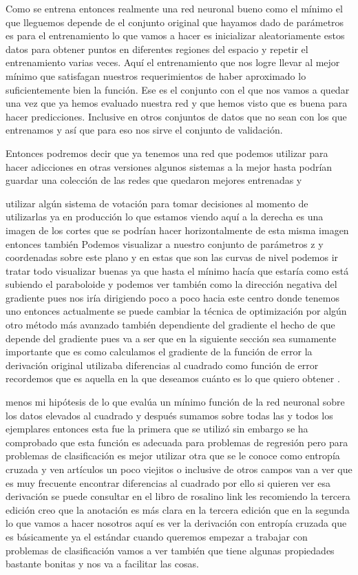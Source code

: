Como se entrena entonces realmente una red neuronal bueno como el mínimo el que lleguemos depende de el conjunto original que hayamos dado de parámetros es para el entrenamiento lo que vamos a hacer es inicializar aleatoriamente estos datos para obtener puntos en diferentes regiones del espacio y repetir el entrenamiento varias veces. Aquí el entrenamiento que nos logre llevar al mejor mínimo que satisfagan nuestros requerimientos de haber aproximado lo suficientemente bien la función. Ese es el conjunto con el que nos vamos a quedar una vez que ya hemos evaluado nuestra red y que hemos visto que es buena para hacer predicciones. Inclusive en otros conjuntos de datos que no sean con los que entrenamos y así que para eso nos sirve el conjunto de validación. 

Entonces podremos decir que ya tenemos una red que podemos utilizar para hacer adicciones en otras versiones algunos sistemas a la mejor hasta podrían guardar una colección de las redes que quedaron mejores entrenadas y 
 
 utilizar algún sistema de votación para tomar decisiones al momento de utilizarlas ya en producción lo que estamos viendo aquí a la derecha es una imagen de los cortes que se podrían hacer horizontalmente de esta misma imagen entonces también 
 Podemos visualizar a nuestro conjunto de parámetros z y coordenadas sobre este plano y en estas que son las curvas de nivel podemos ir tratar todo visualizar buenas ya que hasta el mínimo hacía que estaría como está subiendo el paraboloide y podemos ver también como la dirección negativa del gradiente pues nos iría dirigiendo poco a poco hacia este centro donde tenemos uno entonces actualmente se puede cambiar la técnica de optimización por algún otro método más avanzado también dependiente del gradiente el hecho de que depende del gradiente pues va a ser que en la siguiente sección sea sumamente importante que es como calculamos el gradiente de la función de error la derivación original utilizaba diferencias al cuadrado como función de error recordemos que es aquella en la que deseamos cuánto es lo que quiero obtener .
 
 menos mi hipótesis de lo que evalúa un mínimo función de la red neuronal sobre los datos elevados al cuadrado y después sumamos sobre todas las y todos los ejemplares entonces esta fue la primera que se utilizó sin embargo se ha comprobado que esta función es adecuada para problemas de regresión pero para problemas de clasificación es mejor utilizar otra que se le conoce como entropía cruzada y ven artículos un poco viejitos o inclusive de otros campos van a ver que es muy frecuente encontrar diferencias al cuadrado por ello si quieren ver esa derivación se puede consultar en el libro de rosalino link les recomiendo la tercera edición creo que la anotación es más clara en la tercera edición que en la segunda lo que vamos a hacer nosotros aquí es ver la derivación con entropía cruzada que es básicamente ya el estándar cuando queremos empezar a trabajar con problemas de clasificación vamos a ver también que tiene algunas propiedades bastante bonitas y nos va a facilitar las cosas.
